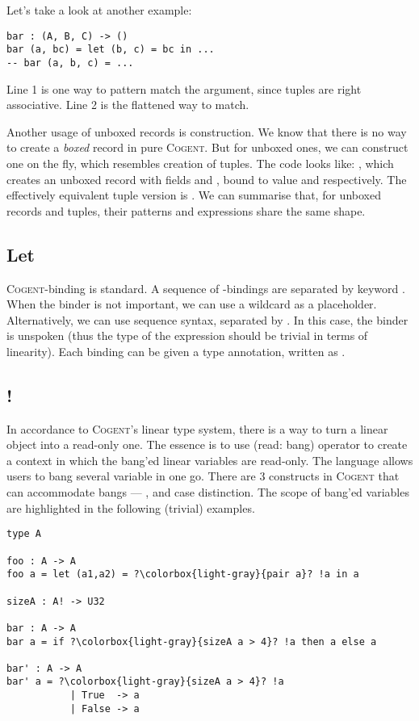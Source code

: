 \documentclass[a4paper]{article}
\newcommand{\cogent}{\textsc{Cogent}\xspace}
\begin{document}
Let's take a look at another example:
\begin{lstlisting}[language=Cogent]
bar : (A, B, C) -> ()
bar (a, bc) = let (b, c) = bc in ...
-- bar (a, b, c) = ...
\end{lstlisting}
Line 1 is one way to pattern match the argument, since tuples are right associative.
Line 2 is the flattened way to match.

Another usage of unboxed records is construction. We know that there is
no way to create a \emph{boxed} record in pure \cogent. But for unboxed ones,
we can construct one on the fly, which resembles creation of tuples. The code looks like:
, which creates an unboxed record with fields 
and , bound to value  and  respectively.
The effectively equivalent tuple version is .
We can summarise that, for unboxed records and tuples, their patterns and expressions
share the same shape.

\subsection{Let} \label{ssec:letbang}
\cogent {}-binding is standard. A sequence of -bindings are separated
by keyword . When the binder is not important, we can use a wildcard \code{\_}
as a placeholder. Alternatively, we can use sequence syntax, separated by \code{;}. In this
case, the binder is unspoken (thus the type of the expression should be trivial in terms of
linearity). Each binding can be given a type annotation, written as .

\subsection{!}
In accordance to \cogent's linear type system, there is a way to turn a linear
object into a read-only one. The essence is to use \code{!} (read: bang) operator to create a
context in which the bang'ed linear variables are read-only. The language allows users to
bang several variable in one go. There are 3 constructs in \cogent that can accommodate bangs ---
,  and case distinction. The scope of bang'ed variables are highlighted in the following
(trivial) examples.
\begin{lstlisting}[language=Cogent,escapechar=?]
type A

foo : A -> A
foo a = let (a1,a2) = ?\colorbox{light-gray}{pair a}? !a in a

sizeA : A! -> U32

bar : A -> A
bar a = if ?\colorbox{light-gray}{sizeA a > 4}? !a then a else a

bar' : A -> A
bar' a = ?\colorbox{light-gray}{sizeA a > 4}? !a
           | True  -> a
           | False -> a
\end{lstlisting}
\end{document}
